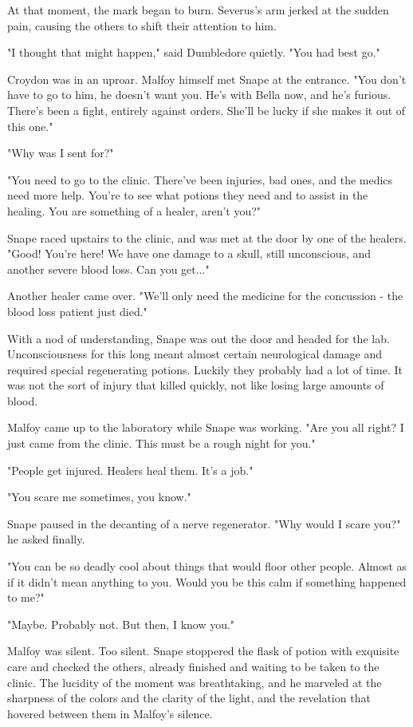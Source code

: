 \documentclass[a4paper,11pt]{article}
\begin{document}
At that moment, the mark began to burn. Severus's arm jerked at the sudden pain, causing the others to shift their attention to him.

"I thought that might happen," said Dumbledore quietly. "You had best go."

Croydon was in an uproar. Malfoy himself met Snape at the entrance. "You don't have to go to him, he doesn't want you. He's with Bella now, and he's furious. There's been a fight, entirely against orders. She'll be lucky if she makes it out of this one."

"Why was I sent for?"

"You need to go to the clinic. There've been injuries, bad ones, and the medics need more help. You're to see what potions they need and to assist in the healing. You are something of a healer, aren't you?"

Snape raced upstairs to the clinic, and was met at the door by one of the healers. "Good! You're here! We have one damage to a skull, still unconscious, and another severe blood loss. Can you get..."

Another healer came over. "We'll only need the medicine for the concussion - the blood loss patient just died."

With a nod of understanding, Snape was out the door and headed for the lab. Unconsciousness for this long meant almost certain neurological damage and required special regenerating potions. Luckily they probably had a lot of time. It was not the sort of injury that killed quickly, not like losing large amounts of blood.

Malfoy came up to the laboratory while Snape was working. "Are you all right? I just came from the clinic. This must be a rough night for you."

"People get injured. Healers heal them. It's a job."

"You scare me sometimes, you know."

Snape paused in the decanting of a nerve regenerator. "Why would I scare you?" he asked finally.

"You can be so deadly cool about things that would floor other people. Almost as if it didn't mean anything to you. Would you be this calm if something happened to me?"

"Maybe. Probably not. But then, I know you."

Malfoy was silent. Too silent. Snape stoppered the flask of potion with exquisite care and checked the others, already finished and waiting to be taken to the clinic. The lucidity of the moment was breathtaking, and he marveled at the sharpness of the colors and the clarity of the light, and the revelation that hovered between them in Malfoy's silence.
\end{document}
